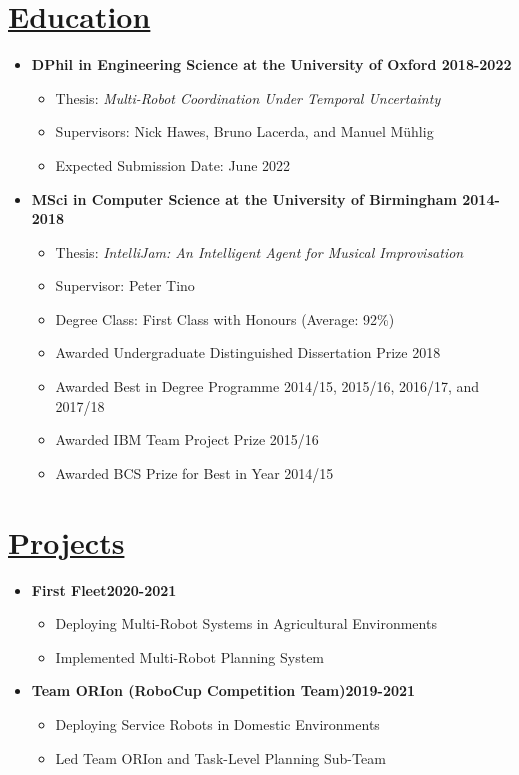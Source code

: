 \documentclass[11pt]{article}
\begin{document}
\section*{\uline{Education}}
\begin {itemize}
\item \textbf{DPhil in Engineering Science at the University of Oxford \hfill 2018-2022} 
\begin{itemize}
    \item Thesis: \emph{Multi-Robot Coordination Under Temporal Uncertainty}
    \item Supervisors: Nick Hawes, Bruno Lacerda, and Manuel M{\"u}hlig
    \item Expected Submission Date: June 2022
\end{itemize}
			
\item \textbf{MSci in Computer Science at the University of Birmingham \hfill 2014-2018}
\begin{itemize}
\item Thesis: \emph{IntelliJam: An Intelligent Agent for Musical Improvisation}
\item Supervisor: Peter Tino
\item Degree Class: First Class with Honours (Average: 92\%)
\item Awarded Undergraduate Distinguished Dissertation Prize 2018
\item Awarded Best in Degree Programme 2014/15, 2015/16, 2016/17, and 2017/18
\item Awarded IBM Team Project Prize 2015/16
\item Awarded BCS Prize for Best in Year 2014/15
\end{itemize}
\end{itemize}

\section*{\underline{Projects}}
\begin{itemize}
\item \textbf{First Fleet\hfill 2020-2021}
\begin{itemize}
\item Deploying Multi-Robot Systems in Agricultural Environments
\item Implemented Multi-Robot Planning System
\end{itemize}
\item \textbf{Team ORIon (RoboCup Competition Team)\hfill 2019-2021}
\begin{itemize}
\item Deploying Service Robots in Domestic Environments
\item Led Team ORIon and Task-Level Planning Sub-Team
\end{itemize}
\end{itemize}
\end{document}
